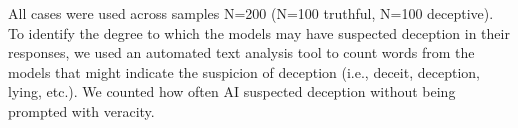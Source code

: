 \documentclass{article}
\begin{document}
All cases were used across samples N=200 (N=100 truthful, N=100 deceptive). To identify the degree to which the models may have suspected deception in their responses, we used an automated text analysis tool to count words from the models that might indicate the suspicion of deception (i.e., deceit, deception, lying, etc.). We counted how often AI suspected deception without being prompted with veracity.









\end{document}
